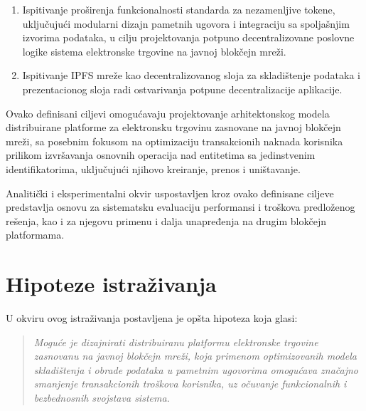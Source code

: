\begin{enumerate}
\item Ispitivanje proširenja funkcionalnosti standarda za nezamenljive tokene, uključujući modularni dizajn pametnih ugovora i integraciju sa spoljašnjim izvorima podataka, u cilju projektovanja potpuno decentralizovane poslovne logike sistema elektronske trgovine na javnoj blokčejn mreži.
\item Ispitivanje IPFS mreže kao decentralizovanog sloja za skladištenje podataka i prezentacionog sloja radi ostvarivanja potpune decentralizacije aplikacije.
\end{enumerate}

Ovako definisani ciljevi omogućavaju projektovanje arhitektonskog modela distribuirane platforme za elektronsku trgovinu zasnovane na javnoj blokčejn mreži, sa posebnim fokusom na optimizaciju transakcionih naknada korisnika prilikom izvršavanja osnovnih operacija nad entitetima sa jedinstvenim identifikatorima, uključujući njihovo kreiranje, prenos i uništavanje.

Analitički i eksperimentalni okvir uspostavljen kroz ovako definisane ciljeve predstavlja osnovu za sistematsku evaluaciju performansi i troškova predloženog rešenja, kao i za njegovu primenu i dalja unapređenja na drugim blokčejn platformama.

\section{Hipoteze istraživanja}
U okviru ovog istraživanja postavljena je opšta hipoteza koja glasi:

\begin{quote}
\textit{Moguće je dizajnirati distribuiranu platformu elektronske trgovine zasnovanu na javnoj blokčejn mreži, koja primenom optimizovanih modela skladištenja i obrade podataka u pametnim ugovorima omogućava značajno smanjenje transakcionih troškova korisnika, uz očuvanje funkcionalnih i bezbednosnih svojstava sistema.}
\end{quote}

